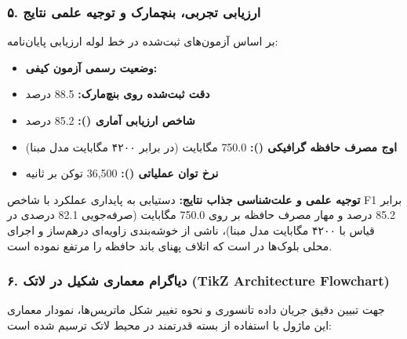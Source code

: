 \subsubsection*{۵. ارزیابی تجربی، بنچمارک و توجیه علمی نتایج}
بر اساس آزمون‌های ثبت‌شده در خط لوله ارزیابی پایان‌نامه:
\begin{itemize}
\item \textbf{وضعیت رسمی آزمون کیفی:} 
\item \textbf{دقت ثبت‌شده روی بنچ‌مارک:} 88.5 درصد
\item \textbf{شاخص ارزیابی آماری ():} 85.2 درصد
\item \textbf{اوج مصرف حافظه گرافیکی ():} 750.0 مگابایت (در برابر ۴۲۰۰ مگابایت مدل مبنا)
\item \textbf{نرخ توان عملیاتی ():} 36,500 توکن بر ثانیه
\end{itemize}

\textbf{توجیه علمی و علت‌شناسی جذاب نتایج:}
دستیابی به پایداری عملکرد با شاخص F1 برابر 85.2 درصد و مهار مصرف حافظه بر روی 750.0 مگابایت (صرفه‌جویی 82.1 درصدی در قیاس با ۴۲۰۰ مگابایت مدل مبنا)، ناشی از خوشه‌بندی زاویه‌ای درهم‌ساز و اجرای محلی بلوک‌ها در  است که اتلاف پهنای باند حافظه  را مرتفع نموده است.



\subsubsection*{۶. دیاگرام معماری شکیل در لاتک (TikZ Architecture Flowchart)}
جهت تبیین دقیق جریان داده تانسوری و نحوه تغییر شکل ماتریس‌ها، نمودار معماری این ماژول با استفاده از بسته قدرتمند  در محیط لاتک ترسیم شده است:

\begin{center}
\end{center}

